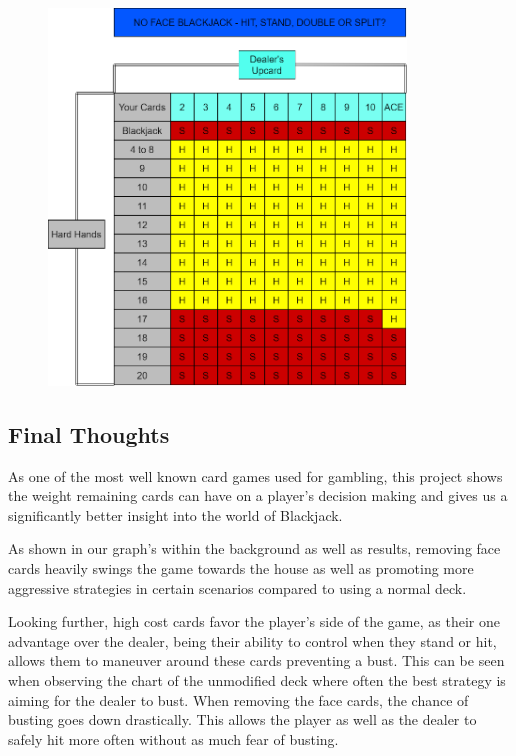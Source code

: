 \documentclass{article}
\begin{document}
		\begin{figure}
			\hypertarget{fig5}{}
			\begin{center}
				\includegraphics[width=9.5cm]{modified-table-strat.png}
			\end{center}
		\end{figure}

        \subsection{Final Thoughts}
	\label{Final Thoughts}

        As one of the most well known card games used for gambling, this project shows the weight remaining cards can have on a player's decision making and gives us a significantly better insight into the world of Blackjack. 
        
        As shown in our graph's within the background as well as results, removing face cards heavily swings the game towards the house as well as promoting more aggressive strategies in certain scenarios compared to using a normal deck. 
        
        Looking further, high cost cards favor the player's side of the game, as their one advantage over the dealer, being their ability to control when they stand or hit, allows them to maneuver around these cards preventing a bust. This can be seen when observing the chart of the unmodified deck where often the best strategy is aiming for the dealer to bust. When removing the face cards, the chance of busting goes down drastically. This allows the player as well as the dealer to safely hit more often without as much fear of busting. 
\end{document}
